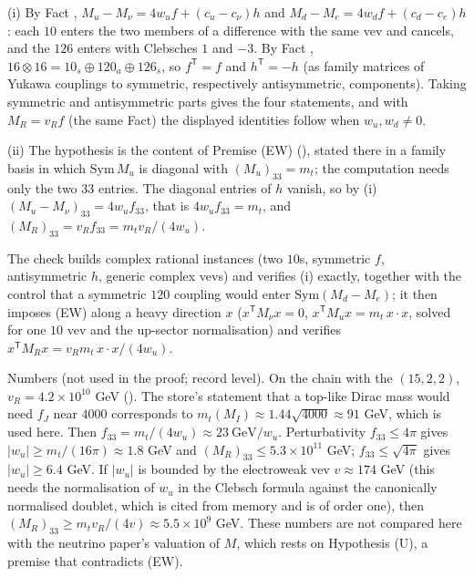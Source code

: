 (i) By Fact , $M_{u} - M_{\nu} = 4w_{u}f + (c_{u} - c_{\nu})h$ and $M_{d} - M_{e} = 4w_{d}f + (c_{d} - c_{e})h$: each $10$ enters the two members of a difference with the same vev and cancels, and the $126$ enters with Clebsches $1$ and $-3$. By Fact , $16 \otimes 16 = 10_{s} \oplus 120_{a} \oplus 126_{s}$, so $f^{\mathsf{T}} = f$ and $h^{\mathsf{T}} = -h$ (as family matrices of Yukawa couplings to symmetric, respectively antisymmetric, components). Taking symmetric and antisymmetric parts gives the four statements, and with $M_{R} = v_{R}f$ (the same Fact) the displayed identities follow when $w_{u}, w_{d} \neq 0$.

(ii) The hypothesis is the content of Premise (EW) (), stated there in a family basis in which $\mathrm{Sym}\,M_{u}$ is diagonal with $(M_{u})_{33} = m_{t}$; the computation needs only the two $33$ entries. The diagonal entries of $h$ vanish, so by (i) $(M_{u} - M_{\nu})_{33} = 4w_{u}f_{33}$, that is $4w_{u}f_{33} = m_{t}$, and $(M_{R})_{33} = v_{R}f_{33} = m_{t}v_{R}/(4w_{u})$.

The check builds complex rational instances (two $10$s, symmetric $f$, antisymmetric $h$, generic complex vevs) and verifies (i) exactly, together with the control that a symmetric $120$ coupling would enter $\mathrm{Sym}(M_{d} - M_{e})$; it then imposes (EW) along a heavy direction $x$ ($x^{\mathsf{T}}M_{\nu}x = 0$, $x^{\mathsf{T}}M_{u}x = m_{t}\,x\cdot x$, solved for one $10$ vev and the up-sector normalisation) and verifies $x^{\mathsf{T}}M_{R}x = v_{R}m_{t}\,x\cdot x/(4w_{u})$.

Numbers (not used in the proof; record level). On the chain with the $(15,2,2)$, $v_{R} = 4.2 \times 10^{10}$ GeV (). The store's statement that a top-like Dirac mass would need $f_{J}$ near $4000$ corresponds to $m_{t}(M_{I}) \approx 1.44\sqrt{4000} \approx 91$ GeV, which is used here. Then $f_{33} = m_{t}/(4w_{u}) \approx 23\ \mathrm{GeV}/w_{u}$. Perturbativity $f_{33} \le 4\pi$ gives $|w_{u}| \ge m_{t}/(16\pi) \approx 1.8$ GeV and $(M_{R})_{33} \le 5.3 \times 10^{11}$ GeV; $f_{33} \le \sqrt{4\pi}$ gives $|w_{u}| \ge 6.4$ GeV. If $|w_{u}|$ is bounded by the electroweak vev $v \approx 174$ GeV (this needs the normalisation of $w_{u}$ in the Clebsch formula against the canonically normalised doublet, which is cited from memory and is of order one), then $(M_{R})_{33} \ge m_{t}v_{R}/(4v) \approx 5.5 \times 10^{9}$ GeV. These numbers are not compared here with the neutrino paper's valuation of $M$, which rests on Hypothesis (U), a premise that contradicts (EW).
